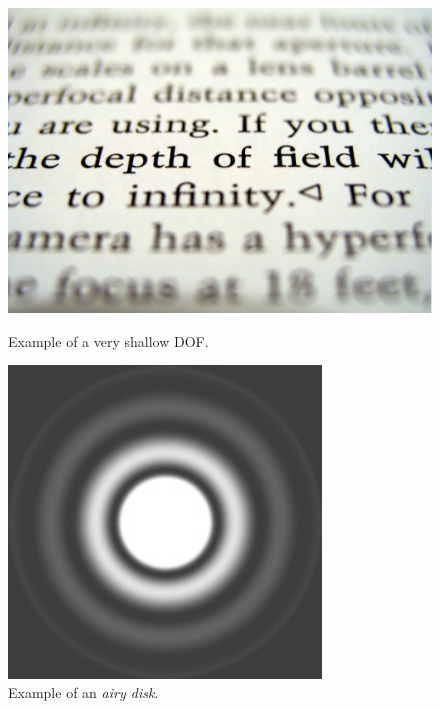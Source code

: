   \begin{figure}[t!]
    \centering
    \begin{minipage}[c]{.48\textwidth}
      \centering
 \includegraphics[width=\textwidth]{./images/tech/dof_txt.jpg}
      \caption{Example of a very shallow \acs{DOF}.}
      \label{fig:dof}
    \end{minipage}
    \hfill
    \begin{minipage}[c]{.48\textwidth}
      \centering
 \includegraphics[width=0.74\textwidth]{./images/tech/airydisk.jpg}
      \caption{Example of an \textit{airy disk}.\\ ~}
      \label{fig:airy-disk}
    \end{minipage}
  \end{figure} \\

